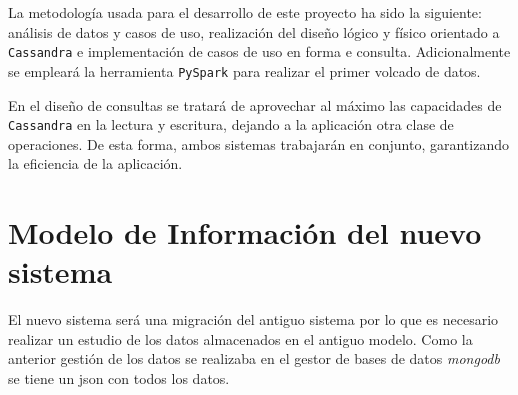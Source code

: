\documentclass[]{article}
\begin{document}
La metodología usada para el desarrollo de este proyecto ha sido la siguiente:
análisis de datos y casos de uso, realización del diseño lógico y físico
orientado a \texttt{Cassandra} e implementación de casos de uso en forma e
consulta. Adicionalmente se empleará la herramienta \texttt{PySpark} para
realizar el primer volcado de datos.

En el diseño de consultas se tratará de aprovechar al máximo las capacidades de
\texttt{Cassandra} en la lectura y escritura, dejando a la aplicación otra clase de
operaciones. De esta forma, ambos sistemas trabajarán en conjunto, garantizando
la eficiencia de la aplicación.


% 

\section{Modelo de Información del nuevo sistema}
\label{sec:modelo_informacion}

El nuevo sistema será una migración del antiguo sistema por lo que es necesario realizar un estudio de los datos almacenados en el antiguo modelo. Como la anterior gestión de los datos se realizaba en el gestor de bases de datos \textit{mongodb} se tiene un json con todos los datos.
\end{document}
